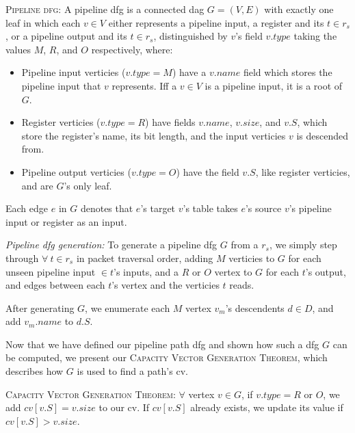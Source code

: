 \vspace{2mm}
\noindent \textsc{Pipeline dfg:} A pipeline dfg is a connected dag $G = (V, E)$ with exactly one leaf in which each $v \in V$ either represents a pipeline input, a register and its $t \in r_s$, or a pipeline output and its $t \in r_s$, distinguished by $v$'s field $v.type$ taking the values $M$, $R$, and $O$ respectively, where:
\begin{itemize}

 \item Pipeline input verticies ($v.type = M$) have a $v.name$ field which stores the pipeline input that $v$ represents. Iff a $v \in V$ is a pipeline input, it is a root of $G$.

 \item Register verticies ($v.type = R$) have fields $v.name$, $v.size$, and $v.S$, which store the register's name, its bit length, and the input verticies $v$ is descended from.

 \item Pipeline output verticies ($v.type = O$) have the field $v.S$, like register verticies, and are $G$'s only leaf.

\end{itemize}

\noindent Each edge $e$ in $G$ denotes that $e$'s target $v$'s table takes $e$'s source $v$'s pipeline input or register as an input.
\vspace{2mm}

\noindent \textit{Pipeline dfg generation:} To generate a pipeline dfg $G$ from a $r_s$, we simply step through $\forall\ t \in r_s$ in packet traversal order, adding $M$ verticies to $G$ for each unseen pipeline input $\in t$'s inputs, and a $R$ or $O$ vertex to $G$ for each $t$'s output, and edges between each $t$'s vertex and the verticies $t$ reads.

After generating $G$, we enumerate each $M$ vertex $v_m$'s descendents $d \in D$, and add $v_m.name$ to $d.S$.

 Now that we have defined our pipeline path dfg and shown how such a dfg $G$ can be computed, we present our \textsc{Capacity Vector Generation Theorem}, which describes how $G$ is used to find a path's cv.


\vspace{2mm}
\noindent \textsc{Capacity Vector Generation Theorem:} $\forall$ vertex $v \in G$, if $v.type = R$ or $O$, we add $cv[v.S] = v.size$ to our cv. If $cv[v.S]$ already exists, we update its value if $cv[v.S] > v.size$.
\vspace{2mm}

